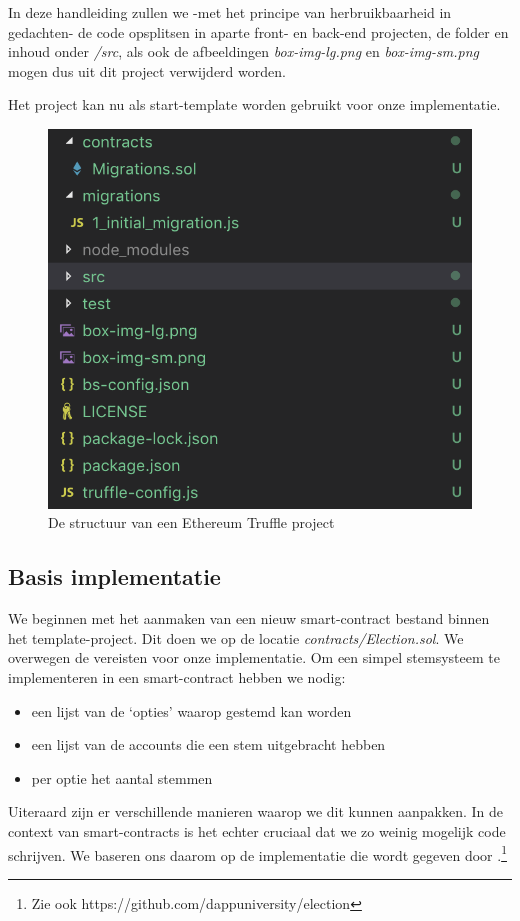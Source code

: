 	In deze handleiding zullen we  -met het principe van herbruikbaarheid in gedachten- de code opsplitsen in aparte front- en back-end projecten, de folder en inhoud onder \textit{\slash src}, als ook de afbeeldingen \textit{box-img-lg.png} en \textit{box-img-sm.png} mogen dus uit dit project verwijderd worden.
	
	Het project kan nu als start-template worden gebruikt voor onze implementatie.
	
	\begin{figure}
		\centering
		\includegraphics[width=\linewidth/2]{img/truffle-template.png}
		\caption{De structuur van een Ethereum Truffle project}
		\label{fig:truffle-template}
	\end{figure}
	
	\subsection{Basis implementatie}
	We beginnen met het aanmaken van een nieuw smart-contract bestand binnen het template-project. Dit doen we op de locatie \textit{contracts\slash Election.sol}. We overwegen de vereisten voor onze implementatie. Om een simpel stemsysteem te implementeren in een smart-contract hebben we nodig:
	\begin{itemize}
		\item een lijst van de `opties' waarop gestemd kan worden
		\item een lijst van de accounts die een stem uitgebracht hebben
		\item per optie het aantal stemmen
	\end{itemize}
	Uiteraard zijn er verschillende manieren waarop we dit kunnen aanpakken. In de context van smart-contracts is het echter cruciaal dat we zo weinig mogelijk code schrijven. We baseren ons daarom op de implementatie die wordt gegeven door \textcite{McCubin2019}.\footnote{Zie ook https://github.com/dappuniversity/election}
	
